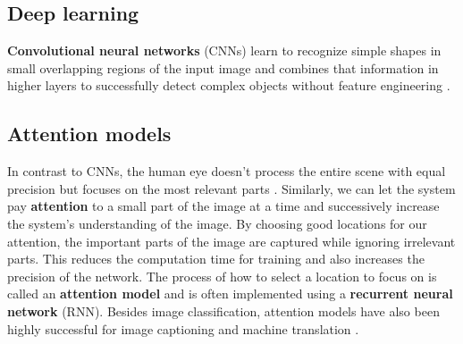 
\subsection{Deep learning}


\textbf{Convolutional neural networks} (CNNs) learn to recognize simple shapes in small overlapping regions of the input image and combines that information in higher layers to successfully detect complex objects without feature engineering \cite{DeepMindAttention}.


\subsection{Attention models}




In contrast to CNNs, the human eye doesn't process the entire scene with equal precision but focuses on the most relevant parts \cite{DeepMindAttention}.
Similarly, we can let the system pay \textbf{attention} to a small part of the image at a time and successively increase the system's understanding of the image.
By choosing good locations for our attention, the important parts of the image are captured while ignoring irrelevant parts.
This reduces the computation time for training and also increases the precision of the network. The process of how to select a location to focus on is called an \textbf{attention model} and is often implemented using a \textbf{recurrent neural network} (RNN). Besides image classification, attention models have also been highly successful for image captioning \cite{AttendAndTell} and machine translation \cite{machine_translation_attention}.

